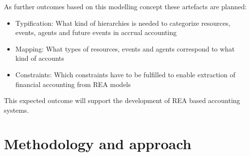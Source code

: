 As further outcomes based on this modelling concept these artefacts are planned:
\begin{itemize}
	\item Typification: What kind of hierarchies is needed to categorize resources, events, agents and future events in accrual  accounting
	\item Mapping: What types of resources, events and agents correspond to what kind of accounts
	\item Constraints: Which constraints have to be fulfilled to enable extraction of financial accounting from REA models
\end{itemize}

This expected outcome will support the development of REA based accounting systems.


%
%
	





\section{Methodology and approach}

